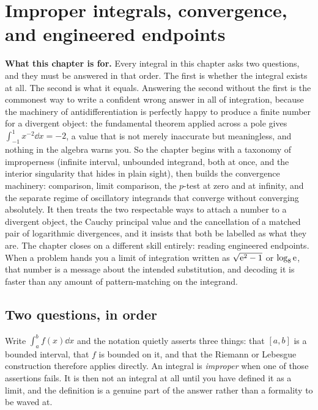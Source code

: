 \chapter{Improper integrals, convergence, and engineered endpoints}

\begin{orient}
\textbf{What this chapter is for.} Every integral in this chapter asks two questions, and they must be answered in that order. The first is whether the integral exists at all. The second is what it equals. Answering the second without the first is the commonest way to write a confident wrong answer in all of integration, because the machinery of antidifferentiation is perfectly happy to produce a finite number for a divergent object: the fundamental theorem applied across a pole gives $\int_{-1}^{1}x^{-2}\dd x=-2$, a value that is not merely inaccurate but meaningless, and nothing in the algebra warns you. So the chapter begins with a taxonomy of improperness (infinite interval, unbounded integrand, both at once, and the interior singularity that hides in plain sight), then builds the convergence machinery: comparison, limit comparison, the $p$-test at zero and at infinity, and the separate regime of oscillatory integrands that converge without converging absolutely. It then treats the two respectable ways to attach a number to a divergent object, the Cauchy principal value and the cancellation of a matched pair of logarithmic divergences, and it insists that both be labelled as what they are. The chapter closes on a different skill entirely: reading engineered endpoints. When a problem hands you a limit of integration written as $\sqrt{\mathrm{e}^{2}-1}$ or $\log_{8}\mathrm{e}$, that number is a message about the intended substitution, and decoding it is faster than any amount of pattern-matching on the integrand.
\end{orient}

\section{Two questions, in order}

Write $\int_a^bf(x)\dd x$ and the notation quietly asserts three things: that $[a,b]$ is a bounded interval, that $f$ is bounded on it, and that the Riemann or Lebesgue construction therefore applies directly. An integral is \emph{improper} when one of those assertions fails. It is then not an integral at all until you have defined it as a limit, and the definition is a genuine part of the answer rather than a formality to be waved at.


